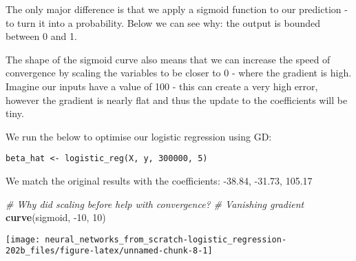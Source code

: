 \documentclass[]{book}
\newenvironment{Shaded}{\begin{snugshade}}{\end{snugshade}}
\newcommand{\CommentTok}[1]{\textcolor[rgb]{0.56,0.35,0.01}{\textit{#1}}}
\newcommand{\DecValTok}[1]{\textcolor[rgb]{0.00,0.00,0.81}{#1}}
\newcommand{\KeywordTok}[1]{\textcolor[rgb]{0.13,0.29,0.53}{\textbf{#1}}}
\newcommand{\NormalTok}[1]{#1}
\begin{document}
The only major difference is that we apply a sigmoid function to our prediction - to turn it into a probability. Below we can see why: the output is bounded between 0 and 1.

The shape of the sigmoid curve also means that we can increase the speed of convergence by scaling the variables to be closer to 0 - where the gradient is high. Imagine our inputs have a value of 100 - this can create a very high error, however the gradient is nearly flat and thus the update to the coefficients will be tiny.

We run the below to optimise our logistic regression using GD:

\begin{verbatim}
beta_hat <- logistic_reg(X, y, 300000, 5)
\end{verbatim}

We match the original results with the coefficients: -38.84, -31.73, 105.17

\begin{Shaded}
\begin{Highlighting}[]
\CommentTok{# Why did scaling before help with convergence?}
\CommentTok{# Vanishing gradient}
\KeywordTok{curve}\NormalTok{(sigmoid, }\DecValTok{-10}\NormalTok{, }\DecValTok{10}\NormalTok{)}
\end{Highlighting}
\end{Shaded}

\begin{center}\texttt{[image: neural\_networks\_from\_scratch-logistic\_regression-202b\_files/figure-latex/unnamed-chunk-8-1]} \end{center}
\end{document}
